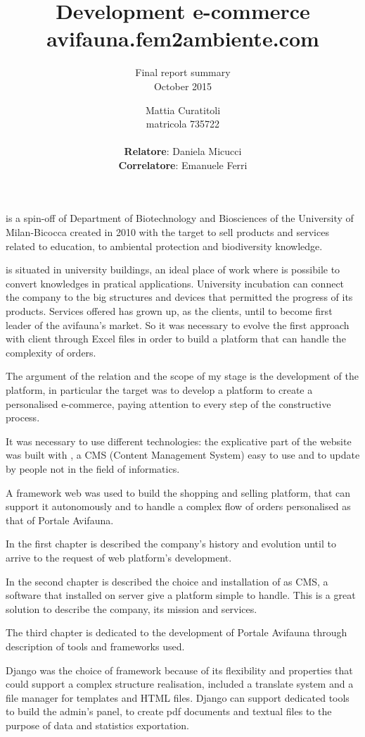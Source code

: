\documentclass[12pt,a4paper]{scrartcl}
\author{
	Mattia Curatitoli \\ 
	matricola 735722 \\
	\\
	\textbf{Relatore}: Daniela Micucci \\
	\textbf{Correlatore}: Emanuele Ferri
}
\title{Development e-commerce avifauna.fem2ambiente.com}
\subtitle{
	Final report summary \\
 	October 2015
}
\date{}
\begin{document}
\maketitle

{\femsrl} is a spin-off of Department of Biotechnology and Biosciences of the University of Milan-Bicocca created in 2010 with the target to sell products and services related to education, to ambiental protection and biodiversity knowledge. 

{\fem} is situated in university buildings, an ideal place of work where is possibile to convert knowledges in pratical applications. University incubation can connect the company to the big structures and devices that permitted the progress of its products. Services offered has grown up, as the clients, until to become first leader of the avifauna’s market. So it was necessary to evolve the first approach with client through Excel files in order to build a platform that can handle the complexity of orders.

The argument of the relation and the scope of my stage is the development of the platform, in particular the target was to develop a platform to create a personalised e-commerce, paying attention to every step of the constructive process.

It was necessary to use different technologies: the explicative part of the website was built with {\wp}, a CMS (Content Management System) easy to use and to update by people not in the field of informatics.

A framework web was used to build the shopping and selling platform, that can support it autonomously and to handle a complex flow of orders personalised as that of Portale Avifauna.

In the first chapter is described the company’s history and evolution until to arrive to the request of web platform’s development.

In the second chapter is described the choice and installation of {\wp} as CMS, a software that installed on server give a platform simple to handle. This is a great solution to describe the company, its mission and services.

The third chapter is dedicated to the development of Portale Avifauna through description of tools and frameworks used.

Django was the choice of framework because of its flexibility and properties that could support a complex structure realisation, included a translate system and a file manager for templates and HTML files. Django can support dedicated tools to build the admin’s panel, to create pdf documents and textual files to the purpose of data and statistics exportation.
\end{document}
